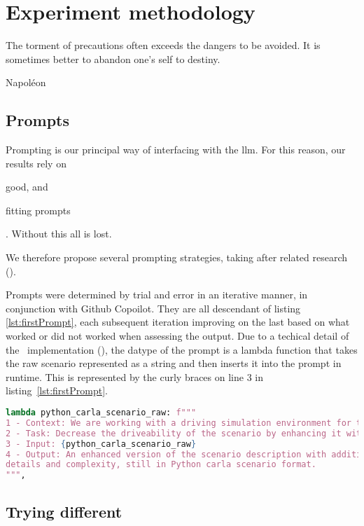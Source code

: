 \chapter{Experiment methodology}\label{sec:experiments}

\epigraph{The torment of precautions often exceeds the dangers to be avoided. It is sometimes better to abandon one's self to destiny.}{Napoléon}

\section{Prompts}

Prompting is our principal way of interfacing with the \acrshort{llm}. For this reason, our results
rely on \begin{inparaenum}
    \item good, and
    \item fitting prompts
\end{inparaenum}. Without this all is lost.

We therefore propose several prompting strategies, taking after related research
().

Prompts were determined by trial and error in an iterative manner, in
conjunction with Github Copoilot. They are all descendant of listing
\ref{lst:firstPrompt}, each subsequent iteration improving on the last based on
what worked or did not worked when assessing the output.
Due to a techical detail of the
\hefe~implementation (), the datype of the prompt is
a lambda function that takes the raw scenario represented as a string and then
inserts it into the prompt in runtime. This is represented by the curly braces
on line \num{3} in listing~\ref{lst:firstPrompt}.

\begin{lstlisting}[caption={The first prompt.}, label={lst:firstPrompt}, language={Python}]
lambda python_carla_scenario_raw: f"""
1 - Context: We are working with a driving simulation environment for the Carla simulator.
2 - Task: Decrease the driveability of the scenario by enhancing it with more details and complexity.
3 - Input: {python_carla_scenario_raw}
4 - Output: An enhanced version of the scenario description with additional
details and complexity, still in Python carla scenario format.
""",
\end{lstlisting}

\section{Trying different }

